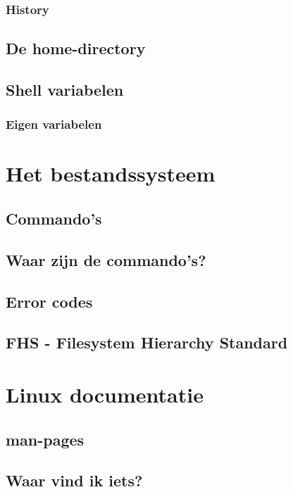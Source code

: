 \documentclass[a4paper,12pt,twoside,openright,titlepage]{book}
\begin{document}
\subsection{History}

\section{De home-directory}

\section{Shell variabelen}

\subsection{Eigen variabelen}


\chapter{Het bestandssysteem}
\section{Commando's}

\section{Waar zijn de commando's?}

\section{Error codes}

\section{FHS - Filesystem Hierarchy Standard}


\chapter{Linux documentatie}

\section{man-pages}

\section{Waar vind ik iets?}

\end{document}
